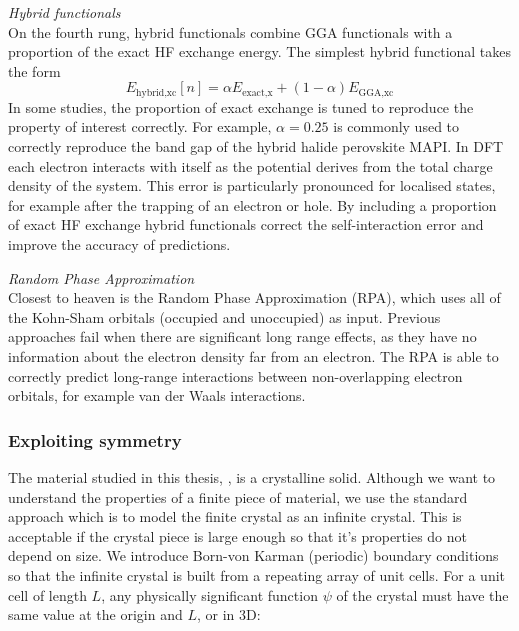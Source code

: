 \textit{Hybrid functionals} \\
On the fourth rung, hybrid functionals combine GGA functionals with a proportion of the exact HF exchange energy. The simplest hybrid functional takes the form
$$
E_{\textrm{hybrid,xc}}\left[n\right] = \alpha E_{\textrm{exact,x}} + \left(1-\alpha\right)E_{\textrm{GGA,xc}}
$$
In some studies, the proportion of exact exchange is tuned to reproduce the property of interest correctly. For example, $\alpha=0.25$ is commonly used to correctly reproduce the band gap of the hybrid halide perovskite MAPI.%
In DFT each electron interacts with itself as the potential derives from the total charge density of the system. This error is particularly pronounced for localised states, for example after the trapping of an electron or hole. By including a proportion of exact HF exchange hybrid functionals correct the self-interaction error and improve the accuracy of predictions.

\textit{Random Phase Approximation} \\
Closest to heaven is the Random Phase Approximation (RPA), which uses all of the Kohn-Sham orbitals (occupied and unoccupied) as input. Previous approaches fail when there are significant long range effects, as they have no information about the electron density far from an electron. The RPA is able to correctly predict long-range interactions between non-overlapping electron orbitals, for example van der Waals interactions.


\subsubsection{Exploiting symmetry}

The material studied in this thesis, , is a crystalline solid. Although we want to understand the properties of a finite piece of material, we use the standard approach which is to model the finite crystal as an infinite crystal. This is acceptable if the crystal piece is large enough so that it's properties do not depend on size. We introduce Born-von Karman (periodic) boundary conditions so that the infinite crystal is built from a repeating array of unit cells. For a unit cell of length $L$, any physically significant function $\psi$ of the crystal must have the same value at the origin and $L$, or in 3D:

